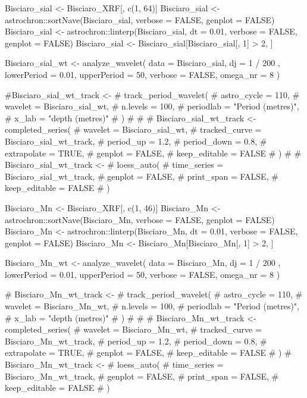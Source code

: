 \documentclass[a4paper]{book}
\begin{document}
\begin{References}
Bisciaro\_sial <- Bisciaro\_XRF[, c(1, 64)]
Bisciaro\_sial <-
 astrochron::sortNave(Bisciaro\_sial, verbose = FALSE, genplot = FALSE)
Bisciaro\_sial <-
 astrochron::linterp(Bisciaro\_sial,
                     dt = 0.01,
                     verbose = FALSE,
                     genplot = FALSE)
Bisciaro\_sial <- Bisciaro\_sial[Bisciaro\_sial[, 1] > 2, ]

Bisciaro\_sial\_wt <-
 analyze\_wavelet(
   data = Bisciaro\_sial,
   dj = 1 / 200 ,
   lowerPeriod = 0.01,
   upperPeriod = 50,
   verbose = FALSE,
   omega\_nr = 8
 )

\#Bisciaro\_sial\_wt\_track <-
\#   track\_period\_wavelet(
\#     astro\_cycle = 110,
\#     wavelet = Bisciaro\_sial\_wt,
\#     n.levels = 100,
\#     periodlab = "Period (metres)",
\#     x\_lab = "depth (metres)"
\#   )
\#
\#
\# Bisciaro\_sial\_wt\_track <- completed\_series(
\#   wavelet = Bisciaro\_sial\_wt,
\#   tracked\_curve = Bisciaro\_sial\_wt\_track,
\#   period\_up = 1.2,
\#   period\_down = 0.8,
\#   extrapolate = TRUE,
\#   genplot = FALSE,
\#   keep\_editable = FALSE
\# )
\#
\# Bisciaro\_sial\_wt\_track <-
\#   loess\_auto(
\#     time\_series = Bisciaro\_sial\_wt\_track,
\#     genplot = FALSE,
\#     print\_span = FALSE,
\#     keep\_editable = FALSE
\#   )


Bisciaro\_Mn <- Bisciaro\_XRF[, c(1, 46)]
Bisciaro\_Mn <-
 astrochron::sortNave(Bisciaro\_Mn, verbose = FALSE, genplot = FALSE)
Bisciaro\_Mn <-
 astrochron::linterp(Bisciaro\_Mn,
                     dt = 0.01,
                     verbose = FALSE,
                     genplot = FALSE)
Bisciaro\_Mn <- Bisciaro\_Mn[Bisciaro\_Mn[, 1] > 2, ]

Bisciaro\_Mn\_wt <-
 analyze\_wavelet(
   data = Bisciaro\_Mn,
   dj = 1 / 200 ,
   lowerPeriod = 0.01,
   upperPeriod = 50,
   verbose = FALSE,
   omega\_nr = 8
 )

\# Bisciaro\_Mn\_wt\_track <-
\#   track\_period\_wavelet(
\#     astro\_cycle = 110,
\#     wavelet = Bisciaro\_Mn\_wt,
\#     n.levels = 100,
\#     periodlab = "Period (metres)",
\#     x\_lab = "depth (metres)"
\#   )
\#
\#
\# Bisciaro\_Mn\_wt\_track <- completed\_series(
\#   wavelet = Bisciaro\_Mn\_wt,
\#   tracked\_curve = Bisciaro\_Mn\_wt\_track,
\#   period\_up = 1.2,
\#   period\_down = 0.8,
\#   extrapolate = TRUE,
\#   genplot = FALSE,
\#   keep\_editable = FALSE
\# )
\# Bisciaro\_Mn\_wt\_track <-
\#   loess\_auto(
\#     time\_series = Bisciaro\_Mn\_wt\_track,
\#     genplot = FALSE,
\#     print\_span = FALSE,
\#     keep\_editable = FALSE
\#   )


\end{References}
\end{document}
